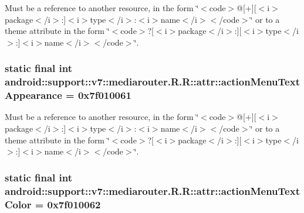 Must be a reference to another resource, in the form \char`\"{}$<$code$>$@\mbox{[}+\mbox{]}\mbox{[}$<$i$>$package$<$/i$>$:\mbox{]}$<$i$>$type$<$/i$>$:$<$i$>$name$<$/i$>$$<$/code$>$\char`\"{} or to a theme attribute in the form \char`\"{}$<$code$>$?\mbox{[}$<$i$>$package$<$/i$>$:\mbox{]}\mbox{[}$<$i$>$type$<$/i$>$:\mbox{]}$<$i$>$name$<$/i$>$$<$/code$>$\char`\"{}. \hypertarget{classandroid_1_1support_1_1v7_1_1mediarouter_1_1_r_1_1attr_3821cbde3bdaf9fbd9ccc13d6d7f8376}{
\subsubsection[{actionMenuTextAppearance}]{\setlength{\rightskip}{0pt plus 5cm}static final int android::support::v7::mediarouter.R.R::attr::actionMenuTextAppearance = 0x7f010061}}
\label{classandroid_1_1support_1_1v7_1_1mediarouter_1_1_r_1_1attr_3821cbde3bdaf9fbd9ccc13d6d7f8376}


Must be a reference to another resource, in the form \char`\"{}$<$code$>$@\mbox{[}+\mbox{]}\mbox{[}$<$i$>$package$<$/i$>$:\mbox{]}$<$i$>$type$<$/i$>$:$<$i$>$name$<$/i$>$$<$/code$>$\char`\"{} or to a theme attribute in the form \char`\"{}$<$code$>$?\mbox{[}$<$i$>$package$<$/i$>$:\mbox{]}\mbox{[}$<$i$>$type$<$/i$>$:\mbox{]}$<$i$>$name$<$/i$>$$<$/code$>$\char`\"{}. \hypertarget{classandroid_1_1support_1_1v7_1_1mediarouter_1_1_r_1_1attr_d18c0944b1f400ea9d52b2666c63750e}{
\subsubsection[{actionMenuTextColor}]{\setlength{\rightskip}{0pt plus 5cm}static final int android::support::v7::mediarouter.R.R::attr::actionMenuTextColor = 0x7f010062}}
\label{classandroid_1_1support_1_1v7_1_1mediarouter_1_1_r_1_1attr_d18c0944b1f400ea9d52b2666c63750e}


